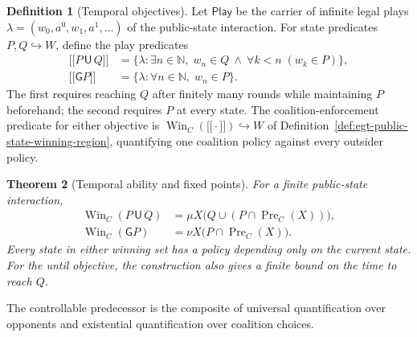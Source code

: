 \documentclass[11pt,a4paper]{article}
\numberwithin{equation}{section}
\newtheorem{theorem}{Theorem}[section]
\theoremstyle{definition}
\newtheorem{definition}[theorem]{Definition}
\theoremstyle{remark}
\theoremstyle{plain}
\providecommand{\llbracket}{\mathopen{[\![}}
\providecommand{\rrbracket}{\mathclose{]\!]}}
\begin{document}
\begin{definition}[Temporal objectives]
\label{def:egt-temporal-objectives}
Let $\mathsf{Play}$ be the carrier of infinite legal plays
$\lambda=(w_0,a^0,w_1,a^1,\ldots)$ of the public-state interaction.
For state predicates $P,Q\hookrightarrow W$, define the play predicates
\[
 \begin{aligned}
 \llbracket P\,\mathsf U\,Q\rrbracket
   &=\{\lambda:\exists n\in\mathbb N,\;
         w_n\in Q\ \wedge\ \forall k<n\;(w_k\in P)\},\\
 \llbracket\mathsf G P\rrbracket
   &=\{\lambda:\forall n\in\mathbb N,\;w_n\in P\}.
 \end{aligned}
\]
The first requires reaching $Q$ after finitely many rounds while
maintaining $P$ beforehand; the second requires $P$ at every state.
The coalition-enforcement predicate for either objective is
$\operatorname{Win}_C(\llbracket\cdot\rrbracket)\hookrightarrow W$
of Definition~\ref{def:egt-public-state-winning-region}, quantifying
one coalition policy against every outsider policy.
\end{definition}
\begin{theorem}[Temporal ability and fixed points]
\label{thm:egt-temporal-ability}
For a finite public-state interaction,
\begin{align*}
 \operatorname{Win}_C(P\,\mathsf U\,Q)
   &=\mu X\bigl(Q\cup(P\cap\operatorname{Pre}_C(X))\bigr),\\
 \operatorname{Win}_C(\mathsf G P)
   &=\nu X\bigl(P\cap\operatorname{Pre}_C(X)\bigr).
\end{align*}
Every state in either winning set has a policy depending only on the
current state. For the until objective, the construction also gives
a finite bound on the time to reach $Q$.
\end{theorem}

\noindent The controllable predecessor is the composite of universal quantification over opponents and existential quantification over coalition choices.
\begin{center}
\end{center}
\end{document}
